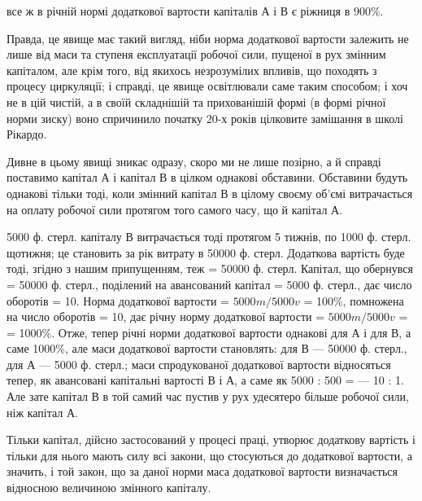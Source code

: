 \parcont{}  %
все ж в річній нормі додаткової вартости капіталів А і В є ріжниця в
900\%.

Правда, це явище має такий вигляд, ніби норма додаткової вартости
залежить не лише від маси та ступеня експлуатації робочої сили,
пущеної в рух змінним капіталом, але крім того, від якихось незрозумілих
впливів, що походять з процесу циркуляції; і справді, це явище
освітлювали саме таким способом; і хоч не в цій чистій, а в своїй складнішій
та прихованішій формі (в формі річної норми зиску) воно спричинило
початку 20-х років цілковите замішання в школі Рікардо.

Дивне в цьому явищі зникає одразу, скоро ми не лише позірно, а
й справді поставимо капітал А і капітал В в цілком однакові обставини.
Обставини будуть однакові тільки тоді, коли змінний капітал В в цілому
своєму об’ємі витрачається на оплату робочої сили протягом того
самого часу, що й капітал А.

5000 ф. стерл. капіталу В витрачається тоді протягом 5 тижнів, по
1000 ф. стерл. щотижня; це становить за рік витрату в 50000 ф. стерл.
Додаткова вартість буде тоді, згідно з нашим припущенням, теж = 50000
ф. стерл. Капітал, що обернувся = 50000 ф. стерл., поділений на авансований
капітал = 5000 ф. стерл., дає число оборотів = 10. Норма додаткової
вартости = $5000 m / 5000 v$ = 100\%, помножена на число оборотів = 10, дає річну норму додаткової
вартости = $5000 m / 5000 v$ =  = 1000\%. Отже, тепер річні норми додаткової вартости однакові для
А і для В, а саме
1000\%, але маси додаткової вартости становлять: для В — 50000 ф. стерл.,
для А — 5000 ф. стерл.; маси спродукованої додаткової вартости відносяться
тепер, як авансовані капітальні вартості В і А, а саме як 5000 : 500 =
— 10 : 1. Але зате капітал В в той самий час пустив у рух удесятеро
більше робочої сили, ніж капітал А.

Тільки капітал, дійсно застосований у процесі праці, утворює додаткову
вартість і тільки для нього мають силу всі закони, що стосуються
до додаткової вартости, а значить, і той закон, що за даної норми маса
додаткової вартости визначається відносною величиною змінного капіталу.


